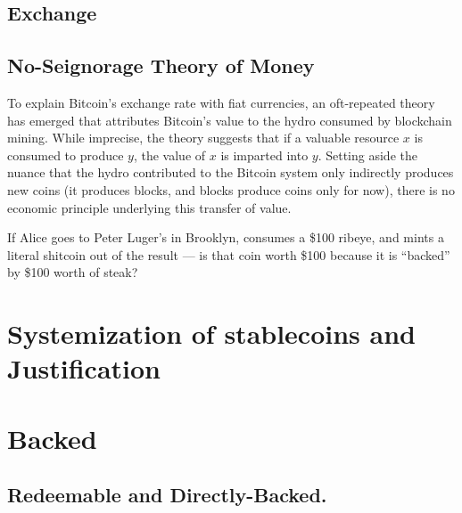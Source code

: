 \subsection{Exchange}

\clearpage
\subsection{No-Seignorage Theory of Money}

To explain Bitcoin's exchange rate with fiat currencies, an oft-repeated theory has emerged that attributes Bitcoin's value to the hydro consumed by blockchain mining. While imprecise, the theory suggests that if a valuable resource $x$ is consumed to produce $y$, the value of $x$ is imparted into $y$. Setting aside the nuance that the hydro contributed to the Bitcoin system only indirectly produces new coins (it produces blocks, and blocks produce coins only for now), there is no economic principle underlying this transfer of value.

If Alice goes to Peter Luger's in Brooklyn, consumes a \$100 ribeye, and mints a literal shitcoin out of the result --- is that coin worth \$100 because it is ``backed'' by \$100 worth of steak?


\section{Systemization of stablecoins and Justification}
 \par





\section{Backed}

\subsection{Redeemable and Directly-Backed.}


